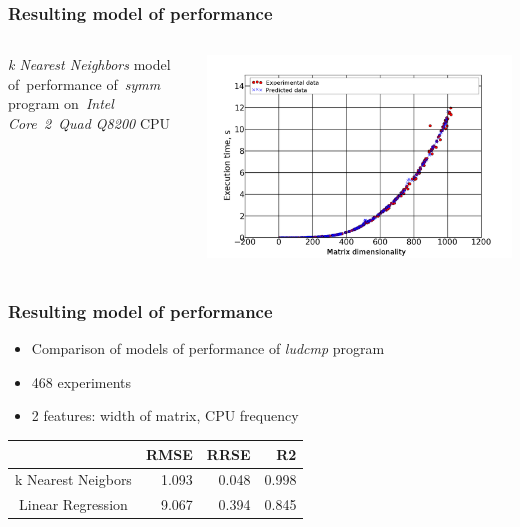 \documentclass{beamer}
\begin{document}
\begin{frame}
\frametitle{Resulting model of performance}
	\begin{columns}
		\begin{column}{0.3\textwidth}
			\textit{k Nearest Neighbors} model of~performance of~\textit{symm} program on~\textit{Intel Core~2~Quad Q8200} CPU
		\end{column}
		\begin{column}{0.7\textwidth}
			\includegraphics[scale=0.2]{symm-knn-q8200}
		\end{column}
	\end{columns}
\end{frame}

\begin{frame}
\frametitle{Resulting model of performance}

	\begin{itemize}
		\item Comparison of models of performance of \textit{ludcmp} program
		\item 468 experiments
		\item 2 features: width of matrix, CPU frequency
	\end{itemize}

	\begin{center}
	\begin{tabular}{|c|r|r|r|}
	\hline
	 & RMSE & RRSE & R2 \\
	\hline
	k Nearest Neigbors & 1.093 & 0.048 & 0.998 \\
	Linear Regression & 9.067 & 0.394 & 0.845 \\
	\hline
	\end{tabular}
	\end{center}

\end{frame}
\end{document}
